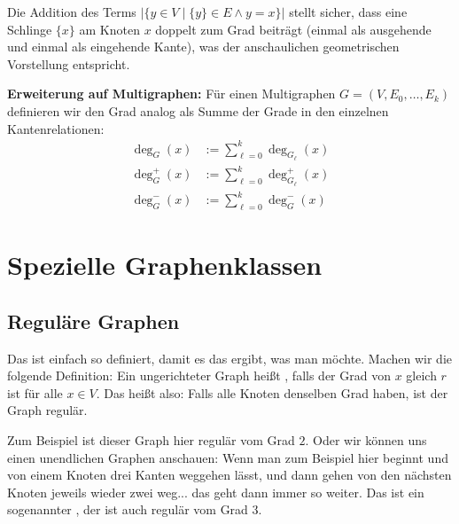 \begin{math-stroke}

\begin{explanation-of-steps}
Die Addition des Terms $\left| \{ y \in V \mid \{y\} \in E \land y = x \} \right|$ stellt sicher, dass eine Schlinge $\{x\}$ am Knoten $x$ doppelt zum Grad beiträgt (einmal als ausgehende und einmal als eingehende Kante), was der anschaulichen geometrischen Vorstellung entspricht.
\end{explanation-of-steps}

\textbf{Erweiterung auf Multigraphen:}
Für einen Multigraphen $G = (V, E_0, \dots, E_k)$ definieren wir den Grad analog als Summe der Grade in den einzelnen Kantenrelationen:
\begin{align}
    \deg_G(x) &:= \sum_{\ell=0}^k \deg_{G_\ell}(x) \\
    \deg^+_G(x) &:= \sum_{\ell=0}^k \deg^+_{G_\ell}(x) \\
    \deg^-_G(x) &:= \sum_{\ell=0}^k \deg^-_G(x)
\end{align}
\end{math-stroke}

\section{Spezielle Graphenklassen}
\subsection{Reguläre Graphen}

\begin{spoken-clean}[00:49:12 - 00:52:42]
Das ist einfach so definiert, damit es das ergibt, was man möchte. Machen wir die folgende Definition: Ein ungerichteter Graph heißt , falls der Grad von $x$ gleich $r$ ist für alle $x \in V$. Das heißt also: Falls alle Knoten denselben Grad haben, ist der Graph regulär.

Zum Beispiel ist dieser Graph hier regulär vom Grad $2$. Oder wir können uns einen unendlichen Graphen anschauen: Wenn man zum Beispiel hier beginnt und von einem Knoten drei Kanten weggehen lässt, und dann gehen von den nächsten Knoten jeweils wieder zwei weg... das geht dann immer so weiter. Das ist ein sogenannter , der ist auch regulär vom Grad $3$.
\end{spoken-clean}

